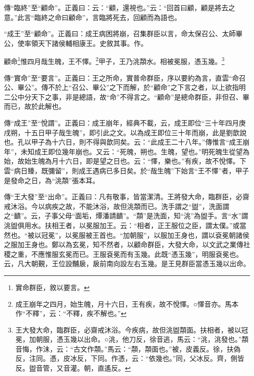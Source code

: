 {\noindent\zhuan{}\fzbyks 傳“臨終”至“顧命”。正義曰：云：“顧，還視也。”云：“回首曰顧，顧是將去之意。”此言“臨終之命曰顧命”，言臨將死去，回顧而為語也。 \par}

{\noindent\shu{}\fzkt “成王”至“顧命”。正義曰：成王病困將崩，召集群臣以言，命太保召公、太師畢公，使率領天下諸侯輔相康王。史敘其事。作。 \par}

顧命\footnote{實命群臣，敘以要言。}惟四月哉生魄，王不懌。\footnote{成王崩年之四月，始生魄，月十六日，王有疾，故不悅懌。○懌音亦。馬本作“不釋”，云：“不釋，疾不解也。”}甲子，王乃洮頮水。相被冕服，憑玉幾。\footnote{王大發大命，臨群臣，必齋戒沐浴。今疾病，故但洮盥頮面。扶相者，被以冠冕，加朝服，憑玉幾以出命。○洮，他刀反，徐音逃，馬云：“洮，洮發也。”頮音悔，作沬，云：“古文作頮。”馬云：“頮，頮面也。”被，皮義反。徐，扶偽反，注同。憑，皮冰反，下同。作憑，云：“依幾也。”同，父冰反。齊，側皆反。盥音管，又音灌。朝，直遙反。}



{\noindent\zhuan{}\fzbyks 傳“實命”至“要言”。正義曰：王之所命，實普命群臣，序以要約為言，直雲“命召公、畢公”。傳不於上“召公、畢公”之下而解，於“顧命”之下言之者，以上欲指明二公中分天下之事，非是總語，故“命”不得言之。“顧命”是總命群臣，非但召、畢而已，故於此解也。 \par}

{\noindent\zhuan{}\fzbyks 傳“成王”至“悅謂”。正義曰：成王崩年，經典不載，云，成王即位“三十年四月庚戌朔，十五日甲子哉生魄”，即引此之文。以為成王即位三十年而崩，此是劉歆說也。孔以甲子為十六日，則不得與歆同矣。云：“此成王二十八年。”傳惟言“成王崩年”，未知成王即位幾年崩也。又云：“死魄，朔也。生魄，望也。”明死魄生從望為始，故始生魄為月十六日，即是望之日也。云：“懌，樂也。”有疾，故不悅懌。下雲“病日臻，既彌留”，則成王遇病已多日矣。於“哉生魄”下始言“王不懌”者，甲子是發命之日，為“洮頮”張本耳。 \par}

{\noindent\zhuan{}\fzbyks 傳“王大發”至“出命”。正義曰：凡有敬事，皆當潔清。王將發大命，臨群臣，必齋戒沐浴。今以病疾之故，不能沐浴，故但洮頮而已。洗手謂之“盥”，洗面謂之“靧”。云，子事父母“面垢，燂潘請靧”。“頮”是洗面，知“洮”為盥手。言“水”謂洮盥俱用水。扶相王者，以冕服加王。云：“相者，正王服位之臣，謂太僕。”或當然也。“被以冠冕”，以冕服被王首也。“加朝服”，以服加王身也，謂以袞冕朝諸侯之服加王身也。鄭以為玄冕，知不然者，以顧命群臣，大發大命，以文武之業傳社稷之重，不應惟服玄冕而已。王服袞冕而有玉幾。此既“憑玉幾”，明服袞冕也。云，凡大朝覲，王位設黼扆，扆前南向設左右玉幾。是王見群臣當憑玉幾以出命。 \par}

